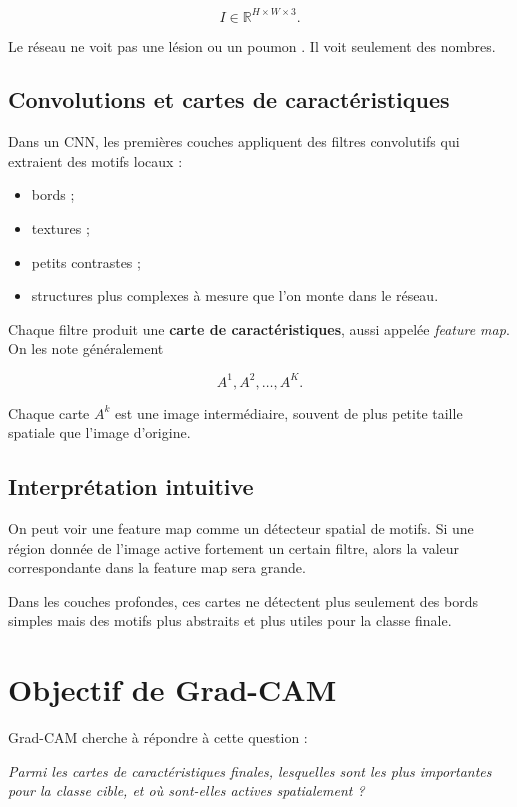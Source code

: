 ﻿\documentclass[11pt,a4paper]{article}
\begin{document}
\[
I \in \mathbb{R}^{H \times W \times 3}.
\]

Le réseau ne voit pas une \og lésion \fg{} ou un \og poumon \fg{}. Il voit seulement des nombres.

\subsection{Convolutions et cartes de caractéristiques}

Dans un CNN, les premières couches appliquent des filtres convolutifs qui extraient des motifs locaux :
\begin{itemize}
    \item bords ;
    \item textures ;
    \item petits contrastes ;
    \item structures plus complexes à mesure que l'on monte dans le réseau.
\end{itemize}

Chaque filtre produit une \textbf{carte de caractéristiques}, aussi appelée \emph{feature map}. On les note généralement

\[
A^1, A^2, \dots, A^K.
\]

Chaque carte $A^k$ est une image intermédiaire, souvent de plus petite taille spatiale que l'image d'origine.

\subsection{Interprétation intuitive}

On peut voir une feature map comme un détecteur spatial de motifs. Si une région donnée de l'image active fortement un certain filtre, alors la valeur correspondante dans la feature map sera grande.

Dans les couches profondes, ces cartes ne détectent plus seulement des bords simples mais des motifs plus abstraits et plus utiles pour la classe finale.

\section{Objectif de Grad-CAM}

Grad-CAM cherche à répondre à cette question :

\begin{center}
\emph{Parmi les cartes de caractéristiques finales, lesquelles sont les plus importantes pour la classe cible, et où sont-elles actives spatialement ?}
\end{center}
\end{document}
